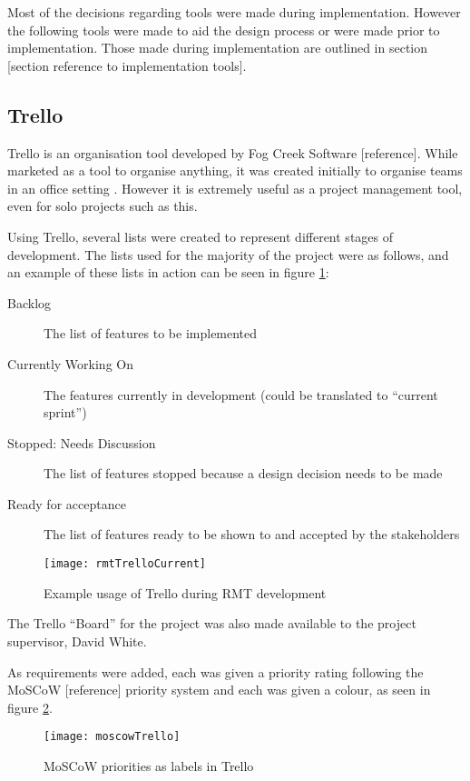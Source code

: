 Most of the decisions regarding tools were made during implementation.
However the following tools were made to aid the design process or were made prior to implementation.
Those made during implementation are outlined in section [section reference to implementation tools].

\subsection{Trello}
Trello \citep{trello} is an organisation tool developed by Fog Creek Software [reference].
While marketed as a tool to organise anything, it was created initially to organise teams in an office setting \citep{trellolaunch}.
However it is extremely useful as a project management tool, even for solo projects such as this.

Using Trello, several lists were created to represent different stages of development.
The lists used for the majority of the project were as follows, and an example of these lists in action can be seen in figure \ref{fig:trello}:
\begin{description}
	\item[Backlog] The list of features to be implemented
	\item[Currently Working On] The features currently in development (could be translated to ``current sprint'')
	\item[Stopped: Needs Discussion] The list of features stopped because a design decision needs to be made
	\item[Ready for acceptance] The list of features ready to be shown to and accepted by the stakeholders
\end{description}

\begin{figure}[t]
	\centering
	\texttt{[image: rmtTrelloCurrent]}
	\caption{Example usage of Trello during RMT development}
	\label{fig:trello}
\end{figure}

The Trello ``Board'' for the project was also made available to the project supervisor, David White.

As requirements were added, each was given a priority rating following the MoSCoW [reference] priority system and each was given a colour, as seen in figure \ref{fig:moscow}.

\begin{figure}[t]
	\centering
	\texttt{[image: moscowTrello]}
	\caption{MoSCoW priorities as labels in Trello}
	\label{fig:moscow}
\end{figure}

